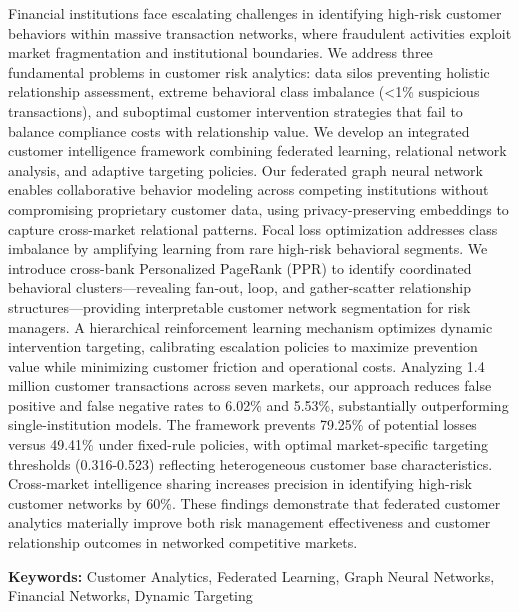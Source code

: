 \documentclass[11pt,english]{article}
\begin{document}
{\noindent Financial institutions face escalating challenges in identifying high-risk customer behaviors within massive transaction networks, where fraudulent activities exploit market fragmentation and institutional boundaries. We address three fundamental problems in customer risk analytics: data silos preventing holistic relationship assessment, extreme behavioral class imbalance (<1\% suspicious transactions), and suboptimal customer intervention strategies that fail to balance compliance costs with relationship value. We develop an integrated customer intelligence framework combining federated learning, relational network analysis, and adaptive targeting policies. Our federated graph neural network enables collaborative behavior modeling across competing institutions without compromising proprietary customer data, using privacy-preserving embeddings to capture cross-market relational patterns. Focal loss optimization addresses class imbalance by amplifying learning from rare high-risk behavioral segments. We introduce cross-bank Personalized PageRank (PPR) to identify coordinated behavioral clusters—revealing fan-out, loop, and gather-scatter relationship structures—providing interpretable customer network segmentation for risk managers. A hierarchical reinforcement learning mechanism optimizes dynamic intervention targeting, calibrating escalation policies to maximize prevention value while minimizing customer friction and operational costs. Analyzing 1.4 million customer transactions across seven markets, our approach reduces false positive and false negative rates to 6.02\% and 5.53\%, substantially outperforming single-institution models. The framework prevents 79.25\% of potential losses versus 49.41\% under fixed-rule policies, with optimal market-specific targeting thresholds (0.316-0.523) reflecting heterogeneous customer base characteristics. Cross-market intelligence sharing increases precision in identifying high-risk customer networks by 60\%. These findings demonstrate that federated customer analytics materially improve both risk management effectiveness and customer relationship outcomes in networked competitive markets.
}


\vspace{1em} 
\textbf{Keywords:} Customer Analytics, Federated Learning, Graph Neural Networks, Financial Networks, Dynamic Targeting  

\newpage











\printbibliography



\end{document}
